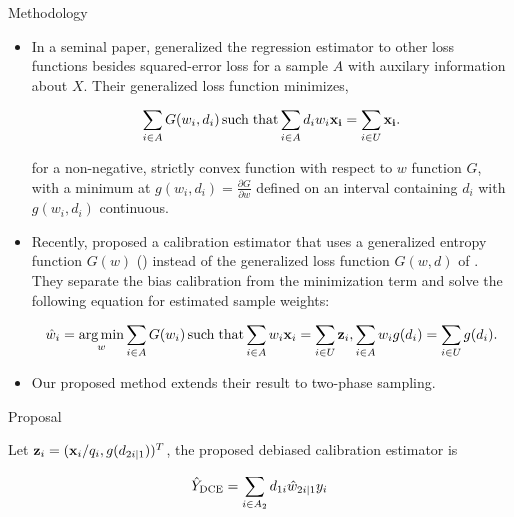 \documentclass[final]{beamer}
\DeclareMathOperator*{\argmin}{arg\,min}
\DeclareMathOperator*{\suchthat}{such\; that}
\newlength{\colwidth}
\begin{document}
\begin{frame}[t]
\begin{columns}[t]
\begin{column}{\colwidth}
\begin{block}{Methodology}

    \begin{itemize}
      \item In a seminal paper, \cite{deville1992calibration} generalized the
        regression estimator to other loss functions besides squared-error loss
        for a sample $A$ with auxilary information about $X$. Their generalized
        loss function minimizes,

        $$
        \sum_{i \in A} G(w_{i}, d_{i}) \suchthat \sum_{i \in
        A} d_{i} w_{i} {\bf x_i} = \sum_{i \in U} {\bf x_i}.
        $$

        for a non-negative, strictly convex function with respect to $w$
        function $G$, with a minimum at $g(w_i, d_i) = \frac{\partial G}{\partial
        w}$ defined on an interval containing $d_{i}$ with $g(w_i, d_i)$
        continuous.
    \end{itemize}


    \begin{itemize}
      \item Recently, \cite{kwon2024debiased} proposed a calibration estimator that
        uses a generalized entropy function $G(w)$ (\cite{gneiting2007strictly})
        instead of the generalized loss function $G(w, d)$ of
        \cite{deville1992calibration}. They separate the bias calibration from
        the minimization term and solve the following equation for estimated
        sample weights:

        $$
        \hat w_{i} = \argmin_{w} \sum_{i \in A} G(w_i)
        \suchthat \sum_{i \in A} w_{i} {\bf{x}}_i = 
        \sum_{i \in U} {\bf{z}}_i,
        \sum_{i \in A} w_i g(d_i) = \sum_{i \in U} g(d_i) .
        $$

      \item Our proposed method extends their result to two-phase sampling.
    \end{itemize}

  \end{block}

  \begin{alertblock}{Proposal}

    Let ${\bf{z}}_i = ({\bf x}_i / q_i, g(d_{2i|1}))^T$, the proposed debiased
    calibration estimator is 
    \vspace{-1.0cm}

    \begin{equation}
    \hat Y_{\rm{DCE}} = \sum_{i \in A_2} d_{1i} \hat w_{2i|1} y_i
    \end{equation}


\end{alertblock}
\end{column}
\end{columns}
\end{frame}
\end{document}
